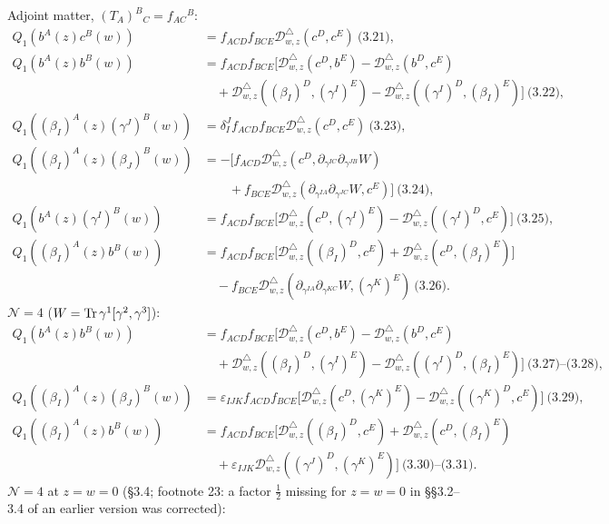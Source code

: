 \documentclass[10pt]{article}
\newcommand{\Dtri}{\mathcal D^{\triangle}_{w,z}}
\begin{document}
Adjoint matter, $(T_A)^B{}_C=f_{AC}{}^B$:
\begin{align*}
Q_1(b^A(z)c^B(w))&=f_{ACD}f_{BCE}\Dtri(c^D,c^E)\ \text{(3.21)},\\
Q_1(b^A(z)b^B(w))&=f_{ACD}f_{BCE}\big[\Dtri(c^D,b^E)-\Dtri(b^D,c^E)\\&\quad+\Dtri((\beta_I)^D,(\gamma^I)^E)-\Dtri((\gamma^I)^D,(\beta_I)^E)\big]\ \text{(3.22)},\\
Q_1((\beta_I)^A(z)(\gamma^J)^B(w))&=\delta^J_If_{ACD}f_{BCE}\Dtri(c^D,c^E)\ \text{(3.23)},\\
Q_1((\beta_I)^A(z)(\beta_J)^B(w))&=-\big[f_{ACD}\Dtri(c^D,\partial_{\gamma^{IC}}\partial_{\gamma^{JB}}W)\\&\qquad+f_{BCE}\Dtri(\partial_{\gamma^{IA}}\partial_{\gamma^{JC}}W,c^E)\big]\ \text{(3.24)},\\
Q_1(b^A(z)(\gamma^I)^B(w))&=f_{ACD}f_{BCE}\big[\Dtri(c^D,(\gamma^I)^E)-\Dtri((\gamma^I)^D,c^E)\big]\ \text{(3.25)},\\
Q_1((\beta_I)^A(z)b^B(w))&=f_{ACD}f_{BCE}\big[\Dtri((\beta_I)^D,c^E)+\Dtri(c^D,(\beta_I)^E)\big]\\&\quad-f_{BCE}\Dtri(\partial_{\gamma^{IA}}\partial_{\gamma^{KC}}W,(\gamma^K)^E)\ \text{(3.26)}.
\end{align*}
$\mathcal N=4$ ($W={\rm Tr}\,\gamma^1[\gamma^2,\gamma^3]$):
\begin{align*}
Q_1(b^A(z)b^B(w))&=f_{ACD}f_{BCE}\big[\Dtri(c^D,b^E)-\Dtri(b^D,c^E)\\&\quad+\Dtri((\beta_I)^D,(\gamma^I)^E)-\Dtri((\gamma^I)^D,(\beta_I)^E)\big]\ \text{(3.27)--(3.28)},\\
Q_1((\beta_I)^A(z)(\beta_J)^B(w))&=\varepsilon_{IJK}f_{ACD}f_{BCE}\big[\Dtri(c^D,(\gamma^K)^E)-\Dtri((\gamma^K)^D,c^E)\big]\ \text{(3.29)},\\
Q_1((\beta_I)^A(z)b^B(w))&=f_{ACD}f_{BCE}\big[\Dtri((\beta_I)^D,c^E)+\Dtri(c^D,(\beta_I)^E)\\&\quad+\varepsilon_{IJK}\Dtri((\gamma^J)^D,(\gamma^K)^E)\big]\ \text{(3.30)--(3.31)}.
\end{align*}
$\mathcal N=4$ at $z=w=0$ (\S3.4; footnote 23: a factor $\tfrac12$ missing for $z=w=0$ in \S\S3.2--3.4 of an earlier version was corrected):
\end{document}
